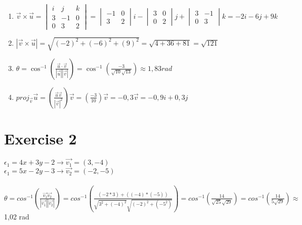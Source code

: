 \documentclass{article}
\begin{document}
\begin{enumerate}
    \item $\vec{v}\times\vec{u} =  \begin{vmatrix}
                                i & j & k\\
                                3 & -1 & 0\\
                                0 & 3 & 2
                                \end{vmatrix}
                                 = \begin{vmatrix}
                                -1 & 0\\ 
                                3 & 2
                                \end{vmatrix}i
                                -
                                \begin{vmatrix}
                                3 & 0\\
                                0 & 2
                                \end{vmatrix}j
                                +
                                \begin{vmatrix}
                                3 & -1\\ 
                                0 & 3
                                \end{vmatrix}k
                                =-2i-6j+9k                                
                                $

    \item $|\vec{v}\times\vec{u}|=\sqrt{(-2)^2+(-6)^2+(9)^2}= \sqrt{4+36+81} = \sqrt{121}$
    \item $\theta=\cos^{-1}({\frac{\vec{u}\cdot\vec{v}}{|\vec{u}||\vec{v}|}})= \cos^{-1}(\frac{-3}{\sqrt{10}\sqrt{13}}) \approx 1,83 rad$
    \item $proj_{\vec{v}} \vec{u} = (\frac{\vec{u}\vec{v}}{|\vec{v}|^2})\vec{v} = (\frac{-3}{10})\vec{v} = -0,3\vec{v} = -0,9i+0,3j$

\end{enumerate}

\begin{center}
\end{center}

\section*{Exercise 2}
$\epsilon_1 = 4x+3y-2 \xrightarrow{} \vec{v_1} = (3,-4)$\\
$\epsilon_1 = 5x-2y-3 \xrightarrow{} \vec{v_2} = (-2,-5)$
\\
\\
$\theta=cos^{-1}(\frac{\vec{v_1}\vec{v_2}}{|\vec{v_1}||\vec{v_2}|}) = cos^{-1}(\frac{(-2*3)+((-4)*(-5))}{\sqrt{3^2+(-4)^2}\sqrt{(-2)^2+(-5^2)}}) = cos^{-1}(\frac{14}{\sqrt{25}\sqrt{29}}) = cos^{-1}(\frac{14}{5\sqrt{29}}) \approx$ 1,02 rad
\end{document}
